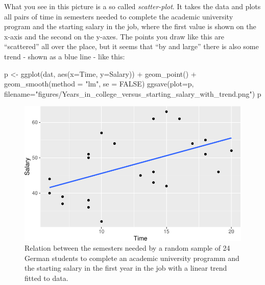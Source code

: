 \documentclass[
  letterpaper,
]{scrbook}
\newenvironment{Shaded}{\begin{snugshade}}{\end{snugshade}}
\newcommand{\AttributeTok}[1]{\textcolor[rgb]{0.40,0.45,0.13}{#1}}
\newcommand{\ConstantTok}[1]{\textcolor[rgb]{0.56,0.35,0.01}{#1}}
\newcommand{\FunctionTok}[1]{\textcolor[rgb]{0.28,0.35,0.67}{#1}}
\newcommand{\NormalTok}[1]{\textcolor[rgb]{0.00,0.23,0.31}{#1}}
\newcommand{\OtherTok}[1]{\textcolor[rgb]{0.00,0.23,0.31}{#1}}
\newcommand{\SpecialCharTok}[1]{\textcolor[rgb]{0.37,0.37,0.37}{#1}}
\newcommand{\StringTok}[1]{\textcolor[rgb]{0.13,0.47,0.30}{#1}}
\begin{document}
What you see in this picture is a so called \emph{scatter-plot}. It
takes the data and plots all pairs of time in semesters needed to
complete the academic university program and the starting salary in the
job, where the first value is shown on the x-axis and the second on the
y-axes. The points you draw like this are ``scattered'' all over the
place, but it seems that ``by and large'' there is also some trend -
shown as a blue line - like this:

\begin{Shaded}
\begin{Highlighting}[]
\NormalTok{p }\OtherTok{\textless{}{-}} \FunctionTok{ggplot}\NormalTok{(dat, }\FunctionTok{aes}\NormalTok{(}\AttributeTok{x=}\NormalTok{Time, }\AttributeTok{y=}\NormalTok{Salary)) }\SpecialCharTok{+}
     \FunctionTok{geom\_point}\NormalTok{() }\SpecialCharTok{+}
     \FunctionTok{geom\_smooth}\NormalTok{(}\AttributeTok{method =} \StringTok{"lm"}\NormalTok{, }\AttributeTok{se =} \ConstantTok{FALSE}\NormalTok{)}
\FunctionTok{ggsave}\NormalTok{(}\AttributeTok{plot=}\NormalTok{p, }\AttributeTok{filename=}\StringTok{"figures/Years\_in\_college\_versus\_starting\_salary\_with\_trend.png"}\NormalTok{)}
\NormalTok{p}
\end{Highlighting}
\end{Shaded}

\begin{figure}[H]

{\centering \includegraphics{./introduction_files/figure-pdf/Years in college versus starting salary with trend-1.pdf}

}

\caption{Relation between the semesters needed by a random sample of 24
German students to complete an academic university programm and the
starting salary in the first year in the job with a linear trend fitted
to data.}

\end{figure}
\end{document}
